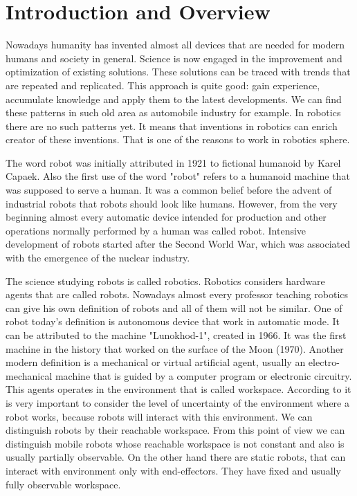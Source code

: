\documentclass[12pt,a4paper]{report}
\begin{document}
	\chapter{Introduction and Overview}
		Nowadays humanity has invented almost all devices that are needed for modern humans and society in general. Science is now engaged in the improvement and optimization of existing solutions. These solutions can be traced with trends that are repeated and replicated. This approach is quite good: gain experience, accumulate knowledge and apply them to the latest developments. We can find these patterns in such old area as automobile industry for example. In robotics there are no such patterns yet. It means that inventions in robotics can enrich creator of these inventions. That is one of the reasons to work in robotics sphere.

		The word robot was initially attributed in 1921 to fictional humanoid by Karel Capaek. Also the first use of the word "robot" refers to a humanoid machine that was supposed to serve a human. It was a common belief before the advent of industrial robots that robots should look like humans. However, from the very beginning almost every automatic device intended for production and other operations normally performed by a human was called robot. Intensive development of robots started after the Second World War, which was associated with the emergence of the nuclear industry.
		
		The science studying robots is called robotics. Robotics considers hardware agents that are called robots. Nowadays almost every professor teaching robotics can give his own definition of robots and all of them will not be similar. One of robot today's definition is autonomous device that work in automatic mode. It can be attributed to the machine "Lunokhod-1", created in 1966. It was the first machine in the history that worked on the surface of the Moon (1970). Another modern definition is a mechanical or virtual artificial agent, usually an electro-mechanical machine that is guided by a computer program or electronic circuitry. This agents operates in the environment that is called workspace. According to \cite{pfeifer2007self} it is very important to consider the level of uncertainty of the environment where a robot works, because robots will interact with this environment. We can distinguish robots by their reachable workspace. From this point of view we can distinguish mobile robots whose reachable workspace is not constant and also is usually partially observable. On the other hand there are static robots, that can interact with environment only with end-effectors. They have fixed and usually fully observable workspace. 
		
\end{document}
